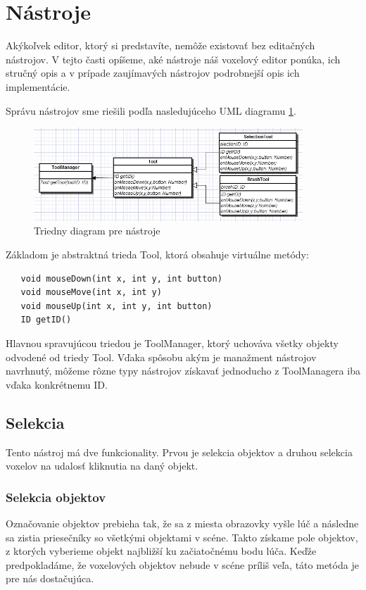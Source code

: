 \section{Nástroje}\label{tools}
Akýkoľvek editor, ktorý si predstavíte, nemôže existovať bez editačných nástrojov. V tejto časti opíšeme, aké nástroje náš voxelový editor ponúka, ich stručný opis a v prípade zaujímavých nástrojov podrobnejší opis ich implementácie.

Správu nástrojov sme riešili podľa nasledujúceho UML diagramu \ref{uml}.

\begin{figure}[ht!]
	\centering
	\includegraphics[width=0.9\textwidth]{tool.jpg}
	\caption{Triedny diagram pre nástroje}
	\label{uml}
\end{figure}


Základom je abstraktná trieda Tool, ktorá obsahuje virtuálne metódy:
\begin{verbatim}
   void mouseDown(int x, int y, int button)
   void mouseMove(int x, int y)
   void mouseUp(int x, int y, int button)
   ID getID()
\end{verbatim}
Hlavnou spravujúcou triedou je ToolManager, ktorý uchováva všetky objekty odvodené od triedy Tool. Vďaka spôsobu akým je manažment nástrojov navrhnutý, môžeme rôzne typy nástrojov získavať jednoducho z ToolManagera iba vďaka konkrétnemu ID.

\subsection{Selekcia}
Tento nástroj má dve funkcionality. Prvou je selekcia objektov a druhou selekcia voxelov na udalosť kliknutia na daný objekt.
\subsubsection{Selekcia objektov}
Označovanie objektov prebieha tak, že sa z miesta obrazovky vyšle lúč a následne sa zistia priesečníky so všetkými objektami v scéne. Takto získame pole objektov, z ktorých vyberieme objekt najbližší ku začiatočnému bodu lúča. Keďže predpokladáme, že voxelových objektov nebude v scéne príliš veľa, táto metóda je pre nás dostačujúca.
